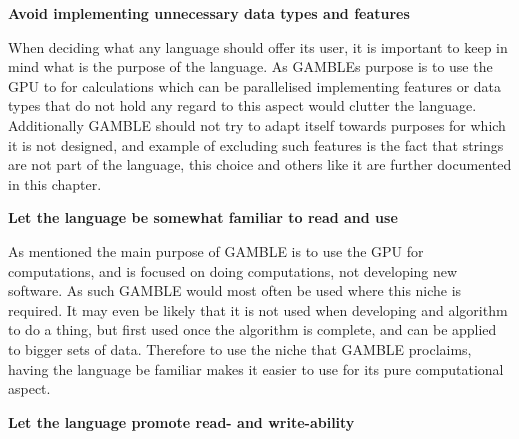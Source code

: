 \textbf{Avoid implementing unnecessary data types and features}

When deciding what any language should offer its user, it is important to keep in mind what is the purpose of the language.
As GAMBLEs purpose is to use the GPU to for calculations which can be parallelised implementing features or data types that do not hold any regard to this aspect would clutter the language.
Additionally GAMBLE should not try to adapt itself towards purposes for which it is not designed, and example of excluding such features is the fact that strings are not part of the language, this choice and others like it are further documented in this chapter.

\textbf{Let the language be somewhat familiar to read and use}

As mentioned the main purpose of GAMBLE is to use the GPU for computations, and is focused on doing computations, not developing new software.
As such GAMBLE would most often be used where this niche is required.
It may even be likely that it is not used when developing and algorithm to do a thing, but first used once the algorithm is complete, and can be applied to bigger sets of data.
Therefore to use the niche that GAMBLE proclaims, having the language be familiar makes it easier to use for its pure computational aspect.

\textbf{Let the language promote read- and write-ability}

